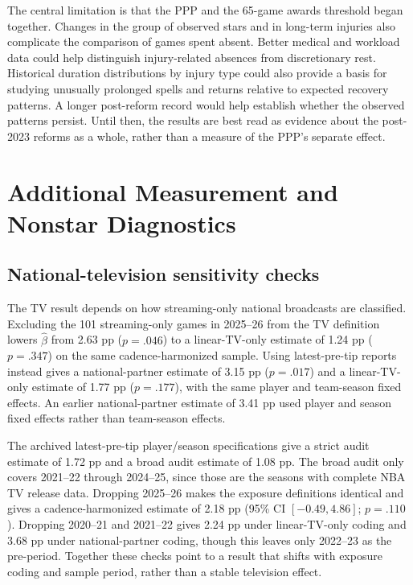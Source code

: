 \documentclass[11pt]{article}
\begin{document}
The central limitation is that the PPP and the 65-game awards threshold began together. Changes in the group of observed stars and in long-term injuries also complicate the comparison of games spent absent. Better medical and workload data could help distinguish injury-related absences from discretionary rest. Historical duration distributions by injury type could also provide a basis for studying unusually prolonged spells and returns relative to expected recovery patterns. A longer post-reform record would help establish whether the observed patterns persist. Until then, the results are best read as evidence about the post-2023 reforms as a whole, rather than a measure of the PPP's separate effect.

\appendix\section{Additional Measurement and Nonstar Diagnostics}\label{app:measurements}

\subsection{National-television sensitivity checks}\label{app:tvsensitivity}

The TV result depends on how streaming-only national broadcasts are classified. Excluding the 101 streaming-only games in 2025--26 from the TV definition lowers $\hat\beta$ from 2.63 pp ($p = .046$) to a linear-TV-only estimate of 1.24 pp ($p = .347$) on the same cadence-harmonized sample. Using latest-pre-tip reports instead gives a national-partner estimate of 3.15 pp ($p = .017$) and a linear-TV-only estimate of 1.77 pp ($p = .177$), with the same player and team-season fixed effects. An earlier national-partner estimate of 3.41 pp used player and season fixed effects rather than team-season effects.

The archived latest-pre-tip player/season specifications give a strict audit estimate of 1.72 pp and a broad audit estimate of 1.08 pp. The broad audit only covers 2021--22 through 2024--25, since those are the seasons with complete NBA TV release data. Dropping 2025--26 makes the exposure definitions identical and gives a cadence-harmonized estimate of 2.18 pp (95\% CI $[-0.49, 4.86]$; $p = .110$). Dropping 2020--21 and 2021--22 gives 2.24 pp under linear-TV-only coding and 3.68 pp under national-partner coding, though this leaves only 2022--23 as the pre-period. Together these checks point to a result that shifts with exposure coding and sample period, rather than a stable television effect.
\end{document}
